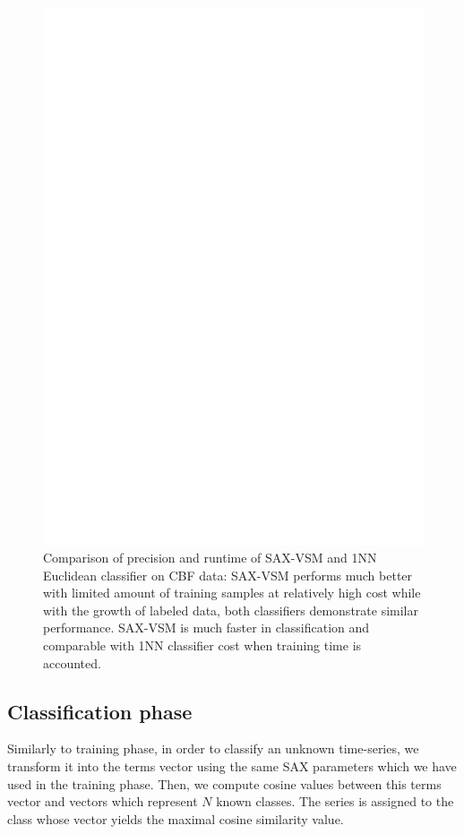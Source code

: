 \documentclass{llncs}
\begin{document}
\begin{figure}[tbp]
   \centering
   \includegraphics[width=125mm]{figures/precision-runtime.ps}
   \caption{Comparison of precision and runtime of SAX-VSM and 1NN Euclidean classifier on
CBF data: SAX-VSM performs much better with limited amount of training samples at relatively high
cost while with the growth of labeled data, both classifiers demonstrate similar performance.
SAX-VSM is much faster in classification and comparable with 1NN classifier cost when training time
is accounted.}
   \label{fig:precision-runtime}
\end{figure}

\subsection{Classification phase}
Similarly to training phase, in order to classify an unknown time-series, we transform it into the
terms vector using the same SAX parameters which we have used in the training phase. 
Then, we compute cosine values between this terms vector and vectors which represent $N$ known
classes. The series is assigned to the class whose vector yields the maximal cosine similarity
value.
\end{document}
